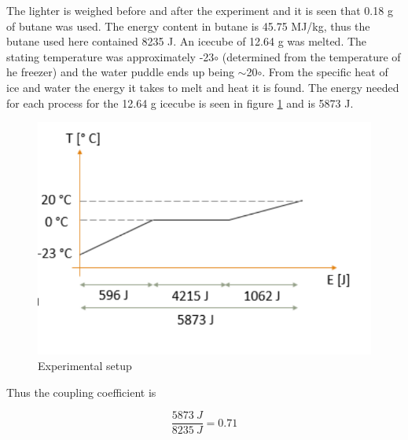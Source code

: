 The lighter is weighed before and after the experiment and it is seen that 0.18 g of butane was used. The energy content in butane is 45.75 MJ/kg, thus the butane used here contained 8235 J. An icecube of 12.64 g was melted. The stating temperature was approximately -23$\circ$ (determined from the temperature of he freezer) and the water puddle ends up being $\sim$20$\circ$. From the specific heat of ice and water the energy it takes to melt and heat it is found. The energy needed for each process for the 12.64 g icecube is seen in figure \ref{fig:lucascouplinggraf} and is 5873 J.
\begin{figure}[htb]
\begin{center}
\includegraphics[scale=0.5]{figures/navtheory/couplinggraf}
\caption{Experimental setup}
\label{fig:lucascouplinggraf}
\end{center}
\end{figure}

Thus the coupling coefficient is 

\begin{equation}
\dfrac{5873\ J}{8235 \ J}= 0.71
\end{equation}


 



